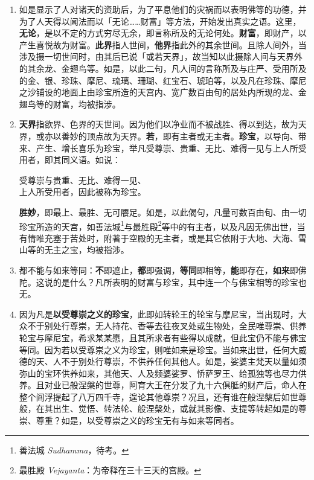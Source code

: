 \begin{enumerate}\item 如是显示了人对诸天的资助后，为了平息他们的灾祸而以表明佛等的功德，并为了人天得以闻法而以「无论……财富」等方法，开始发出真实之语。这里，\textbf{无论}，是以不定的方式穷尽无余，即言称所及的无论何处。\textbf{财富}，即财产，以产生喜悦故为财富。\textbf{此界}指人世间，\textbf{他界}指此外的其余世间。且除人间外，当涉及摄一切世间时，由其后已说「或若天界」，故当知以此摄除人间与天界外的其余龙、金翅鸟等。如是，以此二句，凡人间的言称所及与庄严、受用所及的金、银、珍珠、摩尼、琉璃、珊瑚、红宝石、琥珀等，以及凡在珍珠、摩尼之沙铺设的地面上由珍宝所造的天宫内、宽广数百由旬的居处内所现的龙、金翅鸟等的财富，均被指涉。
\item \textbf{天界}指欲界、色界的天世间。因为他们以净业而不被战胜、得以到达，故为天界，或亦以善妙的顶点故为天界。\textbf{若}，即有主者或无主者。\textbf{珍宝}，以导向、带来、产生、增长喜乐为珍宝，举凡受尊崇、贵重、无比、难得一见与上人所受用者，即其同义语。如说：\begin{quoting}受尊崇与贵重、无比、难得一见、\\上人所受用者，因此被称为珍宝。\end{quoting}\textbf{胜妙}，即最上、最胜、无可餍足。如是，以此偈句，凡量可数百由旬、由一切珍宝所造的天宫，如善法城\footnote{善法城 \textit{Sudhamma}，待考。}与最胜殿\footnote{最胜殿 \textit{Vejayanta}：为帝释在三十三天的宫殿。}等中的有主者，以及凡因无佛出世，当有情唯充塞于苦处时，附著于空殿的无主者，或是其它依附于大地、大海、雪山等的无主之宝，均被指涉。
\item 都不能与如来等同：\textbf{不}即遮止，\textbf{都}即强调，\textbf{等同}即相等，\textbf{能}即存在，\textbf{如来}即佛陀。这说的是什么？凡所表明的财富与珍宝，其中连一个与佛宝相等的珍宝也无。
\item 因为凡是\textbf{以受尊崇之义的珍宝}，此即如转轮王的轮宝与摩尼宝，当出现时，大众不于别处行尊崇，无人持花、香等去往夜叉处或生物处，全民唯尊崇、供养轮宝与摩尼宝，希求某某愿，且其所求者有些得以成就，但此宝仍不能与佛宝等同。因为若以受尊崇之义为珍宝，则唯如来是珍宝。当如来出世，任何大威德的天、人不于别处行尊崇，不供养任何其他人。如是，娑婆主梵天以量如须弥山的宝环供养如来，其他天、人及频婆娑罗、㤭萨罗王、给孤独等也尽力供养。且对业已般涅槃的世尊，阿育大王在分发了九十六俱胝的财产后，命人在整个阎浮提起了八万四千寺，遑论其他尊崇？况且，还有谁在般涅槃后如世尊般，在其出生、觉悟、转法轮、般涅槃处，或就其影像、支提等转起如是的尊崇、尊重？如是，以受尊崇之义的珍宝无有与如来等同者。

\end{enumerate}
